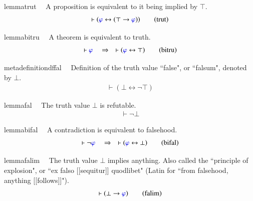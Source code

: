 \begin{restatable}{lemma}{trut}~~ A proposition is equivalent to it being
implied by $\top$.  
\begin{align}
\vdash ( \mw{\varphi} \leftrightarrow ( \top \rightarrow \mw{\varphi} )
    )\label{eq:trut}\tag{trut}
\end{align}
\end{restatable}

\begin{restatable}{lemma}{bitru}~~ A theorem is equivalent to truth. 
~
\begin{align}
\vdash \mw{\varphi}\quad\Rightarrow\quad \vdash ( \mw{\varphi} \leftrightarrow
    \top )\label{eq:bitru}\tag{bitru}
\end{align}
\end{restatable}

\begin{restatable}{metadefinition}{dffal}~~ Definition of the truth value ``false",
or ``falsum", denoted by $\bot$.
\begin{align}
\vdash ( \bot \leftrightarrow \lnot \top )\label{eq:df-fal}\tag{df-fal}
\end{align}
\end{restatable}

\begin{restatable}{lemma}{fal}~~ The truth value $\bot$ is refutable. 
~  ~
\begin{align}
\vdash \lnot \bot\label{eq:fal}\tag{fal}
\end{align}
\end{restatable}

\begin{restatable}{lemma}{bifal}~~ A contradiction is equivalent to falsehood. 
~
\begin{align}
\vdash \lnot \mw{\varphi}\quad\Rightarrow\quad \vdash ( \mw{\varphi}
    \leftrightarrow \bot )\label{eq:bifal}\tag{bifal}
\end{align}
\end{restatable}

\begin{restatable}{lemma}{falim}~~ The truth value $\bot$ implies anything. 
Also called the ``principle of
     explosion", or ``ex falso [[sequitur]] quodlibet" (Latin for ``from
     falsehood, anything [[follows]]"). 
\begin{align}
\vdash ( \bot \rightarrow \mw{\varphi} )\label{eq:falim}\tag{falim}
\end{align}
\end{restatable}

